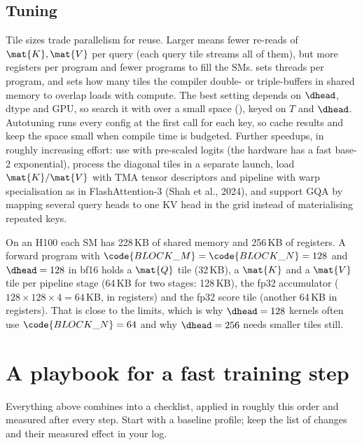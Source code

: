 \subsection{Tuning}

Tile sizes trade parallelism for reuse. Larger  means fewer re-reads of $\mat{K},\mat{V}$
per query (each query tile streams all of them), but more registers per program and fewer programs
to fill the SMs.  sets threads per program, and  sets how many tiles the
compiler double- or triple-buffers in shared memory to overlap loads with compute. The best setting
depends on $\dhead$, dtype and GPU, so search it with  over a small space
(), keyed on $T$ and $\dhead$. Autotuning runs every
config at the first call for each key, so cache results and keep the space small when
compile time is budgeted. Further speedups, in roughly increasing effort: use  with
pre-scaled logits (the hardware has a fast base-2 exponential), process the diagonal tiles in a
separate launch, load $\mat{K}/\mat{V}$ with TMA tensor descriptors and pipeline with warp
specialisation as in FlashAttention-3 (Shah et al., 2024), and support GQA by mapping several query
heads to one KV head in the grid instead of materialising repeated keys.

\begin{napkinmath}
On an H100 each SM has 228\,KB of shared memory and 256\,KB of registers. A forward program with
$\code{BLOCK\_M}=\code{BLOCK\_N}=128$ and $\dhead=128$ in bf16 holds a $\mat{Q}$ tile (32\,KB), a
$\mat{K}$ and a $\mat{V}$ tile per pipeline stage (64\,KB for two stages: 128\,KB), the fp32
accumulator ($128\times128\times4=64$\,KB, in registers) and the fp32 score tile (another 64\,KB in
registers). That is close to the limits, which is why $\dhead=128$ kernels often use
$\code{BLOCK\_N}=64$ and why $\dhead=256$ needs smaller tiles still.
\end{napkinmath}

\section{A playbook for a fast training step}\label{sec:perf:playbook}

Everything above combines into a checklist, applied in roughly this order and measured after every
step. Start with a baseline profile; keep the list of changes and their measured effect in your log.

